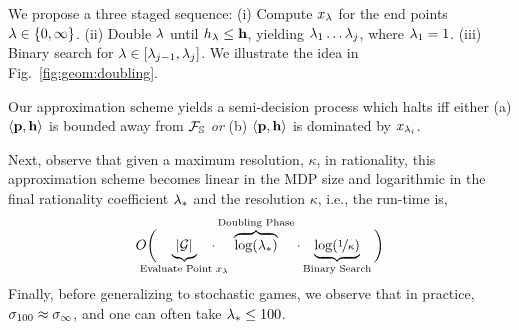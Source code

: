 We propose a three staged sequence: (i) Compute $x_\lambda$ for the end
points $\lambda \in \{0, \infty\}$.  (ii) Double $\lambda$ until $h_\lambda \leq
\mathbf{h}$, yielding $\lambda_1\ldots \lambda_j$, where $\lambda_1 = 1$.
(iii) Binary search for $\lambda \in [\lambda_{j-1}, \lambda_{j}]$. We illustrate the idea in Fig.~\ref{fig:geom:doubling}.
\begin{mdframed}
  Our approximation scheme yields a semi-decision process which halts
  iff either (a) $\langle \mathbf{p}, \mathbf{h} \rangle$ is
  bounded away from $\mathcal{F}_{\mathbb{S}}$ \emph{or} (b)
  $\langle \mathbf{p}, \mathbf{h} \rangle$ is dominated by
  $x_{\lambda_i}$.
\end{mdframed}
Next, observe that given a maximum resolution, $\kappa$, in
rationality, this approximation scheme becomes linear in the MDP size
and logarithmic in the final rationality coefficient $\lambda_*$ and the
resolution $\kappa$, i.e., the run-time is,
\begin{equation}
  O\bigg(\hspace{-1.4em}\underbrace{|\sg|}_{\text{Evaluate Point $x_\rat$}}\hspace{-1.4em}\cdot\overbrace{\log(\rat_*)}^{\text{Doubling Phase}}\cdot\underbrace{\log(\nicefrac{1}{\kappa})}_{\text{Binary Search}}\bigg)
\end{equation}
Finally, before generalizing to stochastic games, we observe that in
practice, $\sigma_{100} \approx \sigma_\infty$, and one can often take
$\lambda_* \leq 100$.

